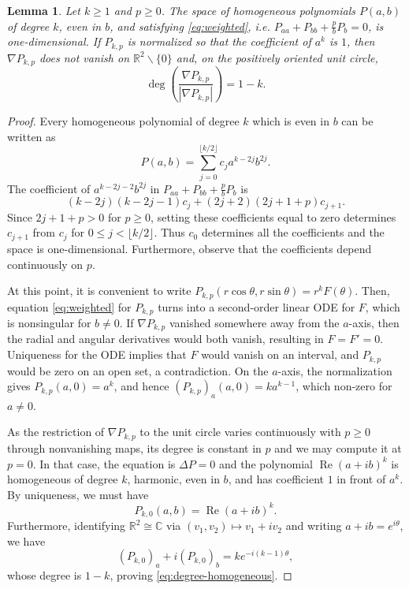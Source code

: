 \documentclass[leqno,11pt]{amsart}
\numberwithin{equation}{section}
\newcommand{\bbR}{\mathbb{R}}
\DeclareMathOperator\degmap{deg}
\newtheorem{lemma}{Lemma}
\theoremstyle{definition}
\begin{document}
	\begin{lemma}\label{lem:homogeneous}
		Let $k\geq1$ and $p\geq0$. The space of homogeneous polynomials $P(a,b)$ of degree $k$, even in $b$, and satisfying \eqref{eq:weighted}, i.e. $P_{aa}+P_{bb}+\frac{p}{b}P_b=0$, is one-dimensional. If $P_{k,p}$ is normalized so that the coefficient of $a^k$ is $1$, then $\nabla P_{k,p}$ does not vanish on $\bbR^2\backslash\{0\}$ and, on the positively oriented unit circle,
		\begin{equation}\label{eq:degree-homogeneous}
			\degmap\left(\frac{\nabla P_{k,p}}{|\nabla P_{k,p}|}\right)=1-k.
		\end{equation}
	\end{lemma}
	
	\begin{proof}
		Every homogeneous polynomial of degree $k$ which is even in $b$ can be written as
		\begin{equation}\label{eq:Pexpansion}
			P(a,b)=\sum_{j=0}^{\lfloor k/2\rfloor}c_j a^{k-2j}b^{2j}.
		\end{equation}
		The coefficient of $a^{k-2j-2}b^{2j}$ in $P_{aa}+P_{bb}+\frac{p}{b}P_b$ is
		\[
		(k-2j)(k-2j-1)c_j+(2j+2)(2j+1+p)c_{j+1}.
		\]
		Since $2j+1+p>0$ for $p\geq0$, setting these coefficients equal to zero determines $c_{j+1}$ from $c_j$ for $0\leq j<\lfloor k/2\rfloor$. Thus $c_0$ determines all the coefficients and the space is one-dimensional. Furthermore, observe that the coefficients depend continuously on $p$.
		
		At this point, it is convenient to write $P_{k,p}(r\cos\theta,r\sin\theta)=r^kF(\theta)$. Then, equation \eqref{eq:weighted} for $P_{k,p}$ turns into a second-order linear ODE for $F$, which is nonsingular for $b\neq0$. If $\nabla P_{k,p}$ vanished somewhere away from the $a$-axis, then the radial and angular derivatives would both vanish, resulting in $F=F'=0$. Uniqueness for the ODE implies that $F$ would vanish on an interval, and $P_{k,p}$ would be zero on an open set, a contradiction. On the $a$-axis, the normalization gives $P_{k,p}(a,0)=a^k$, and hence $(P_{k,p})_a(a,0)=ka^{k-1}$, which non-zero for $a\neq0$.
		
		As the restriction of $\nabla P_{k,p}$ to the unit circle varies continuously with $p\geq0$ through nonvanishing maps, its degree is constant in $p$ and we may compute it at $p=0$. In that case, the equation is $\Delta P=0$ and the polynomial $\operatorname{Re}(a+ib)^k$ is homogeneous of degree $k$, harmonic, even in $b$, and has coefficient $1$ in front of $a^k$. By uniqueness, we must have
		\[
		P_{k,0}(a,b)=\operatorname{Re}(a+ib)^k.
		\]
		Furthermore, identifying $\mathbb R^2 \cong \mathbb C$ via $(v_1,v_2) \mapsto v_1+iv_2$ and writing $a+ib=e^{i\theta}$, we have
		\[
		(P_{k,0})_a+i(P_{k,0})_b=ke^{-i(k-1)\theta},
		\]
		whose degree is $1-k$, proving \eqref{eq:degree-homogeneous}.
	\end{proof}
	
\end{document}
